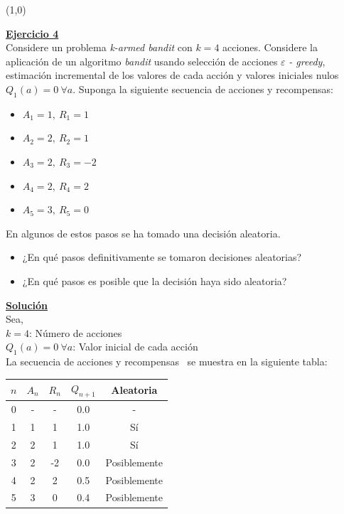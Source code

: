 \documentclass[12pt]{article}
\newlength\tindent
\renewcommand{\indent}{\hspace*{\tindent}}
\begin{document}
    \line(1,0){\textwidth}

    \indent\underline{\textbf{Ejercicio 4}}\\
    Considere un problema \textit{k-armed bandit} con $k = 4$ acciones.
    Considere la aplicación de un algoritmo \textit{bandit} usando selección de acciones $\varepsilon$ \textit{- greedy}, estimación incremental de los valores de cada acción y valores iniciales nulos $Q_{1}(a) = 0\ \forall a$.
    Suponga la siguiente secuencia de acciones y recompensas:

    \begin{itemize}
        \item $A_{1}=1,\ R_{1}=1$
        \item $A_{2}=2,\ R_{2}=1$
        \item $A_{3}=2,\ R_{3}=-2$
        \item $A_{4}=2,\ R_{4}=2$
        \item $A_{5}=3,\ R_{5}=0$
    \end{itemize}

    En algunos de estos pasos se ha tomado una decisión aleatoria.

    \begin{itemize}
        \item ¿En qué pasos definitivamente se tomaron decisiones aleatorias?
        \item ¿En qué pasos es posible que la decisión haya sido aleatoria?
    \end{itemize}

    \indent\underline{\textbf{Solución}}\\
    Sea,\\
    $k = 4$: Número de acciones \\
    $Q_{1}(a) = 0\ \forall a$: Valor inicial de cada acción \\

    La secuencia de acciones y recompensas~\cite{kubat2015introduction} se muestra en la siguiente tabla:

    \begin{table}[H]
        \centering
        \begin{tabular}{|c|c|c|c|c|}
            \hline
            $n$ & $A_n$ & $R_n$ & $Q_{n+1}$ & Aleatoria  \\
            \hline
            0 & - & -  & 0.0  & -               \\
            1 & 1 & 1  & 1.0  & Sí              \\
            2 & 2 & 1  & 1.0  & Sí              \\
            3 & 2 & -2 & 0.0  & Posiblemente    \\
            4 & 2 & 2  & 0.5  & Posiblemente    \\
            5 & 3 & 0  & 0.4  & Posiblemente    \\
            \hline
        \end{tabular}\label{tab:table}
    \end{table}
\end{document}
